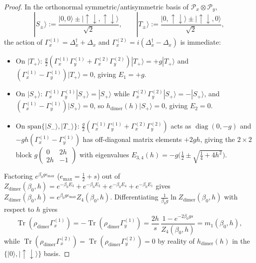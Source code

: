 \documentclass[11pt]{article}
\theoremstyle{definition}
\theoremstyle{remark}
\DeclareMathOperator{\Tr}{Tr}
\DeclareMathOperator{\diag}{diag}
\newcommand{\calP}{\mathcal{P}}
\begin{document}
\begin{proof}
In the orthonormal symmetric/antisymmetric basis of $\calP_x \otimes \calP_y$,
\begin{equation*}
|S_\pm\rangle := \frac{|0,0\rangle \pm |\uparrow\downarrow,\uparrow\downarrow\rangle}{\sqrt{2}}, \qquad |T_\pm\rangle := \frac{|0,\uparrow\downarrow\rangle \pm |\uparrow\downarrow,0\rangle}{\sqrt{2}},
\end{equation*}
the action of $\Gamma_x^{(1)} = \Delta_x^\dagger + \Delta_x$ and $\Gamma_x^{(2)} = i(\Delta_x^\dagger - \Delta_x)$ is immediate:
\begin{itemize}[leftmargin=2em]
\item On $|T_+\rangle$: $\frac{g}{2}(\Gamma_x^{(1)}\Gamma_y^{(1)} + \Gamma_x^{(2)}\Gamma_y^{(2)})|T_+\rangle = +g|T_+\rangle$ and $(\Gamma_x^{(1)} - \Gamma_y^{(1)})|T_+\rangle = 0$, giving $E_1 = +g$.
\item On $|S_+\rangle$: $\Gamma_x^{(1)}\Gamma_y^{(1)}|S_+\rangle = |S_+\rangle$ while $\Gamma_x^{(2)}\Gamma_y^{(2)}|S_+\rangle = -|S_+\rangle$, and $(\Gamma_x^{(1)} - \Gamma_y^{(1)})|S_+\rangle = 0$, so $h_{\mathrm{dimer}}(h)|S_+\rangle = 0$, giving $E_2 = 0$.
\item On $\mathrm{span}\{|S_-\rangle, |T_-\rangle\}$: $\frac{g}{2}(\Gamma_x^{(1)}\Gamma_y^{(1)} + \Gamma_x^{(2)}\Gamma_y^{(2)})$ acts as $\diag(0, -g)$ and $-gh(\Gamma_x^{(1)} - \Gamma_y^{(1)})$ has off-diagonal matrix elements $+2gh$, giving the $2 \times 2$ block $g\begin{pmatrix} 0 & 2h \\ 2h & -1 \end{pmatrix}$ with eigenvalues $E_{3,4}(h) = -g\bigl(\frac{1}{2} \pm \sqrt{\frac{1}{4} + 4h^2}\bigr)$.
\end{itemize}
Factoring $e^{\beta_0 g e_{\max}}$ ($e_{\max} = \frac{1}{2} + s$) out of $Z_{\mathrm{dimer}}(\beta_0, h) = e^{-\beta_0 E_3} + e^{-\beta_0 E_2} + e^{-\beta_0 E_4} + e^{-\beta_0 E_1}$ gives $Z_{\mathrm{dimer}}(\beta_0, h) = e^{\beta_0 g e_{\max}} Z_4(\beta_0, h)$. Differentiating $\frac{1}{\beta_0 g}\ln Z_{\mathrm{dimer}}(\beta_0, h)$ with respect to $h$ gives
\begin{equation*}
\Tr(\rho_{\mathrm{dimer}} \Gamma_x^{(1)}) = -\Tr(\rho_{\mathrm{dimer}} \Gamma_y^{(1)}) = \frac{2h}{s}\,\frac{1 - e^{-2\beta_0 g s}}{Z_4(\beta_0, h)} = m_1(\beta_0, h),
\end{equation*}
while $\Tr(\rho_{\mathrm{dimer}}\Gamma_x^{(2)}) = \Tr(\rho_{\mathrm{dimer}}\Gamma_y^{(2)}) = 0$ by reality of $h_{\mathrm{dimer}}(h)$ in the $\{|0\rangle, |\uparrow\downarrow\rangle\}$ basis.


\end{proof}
\end{document}
